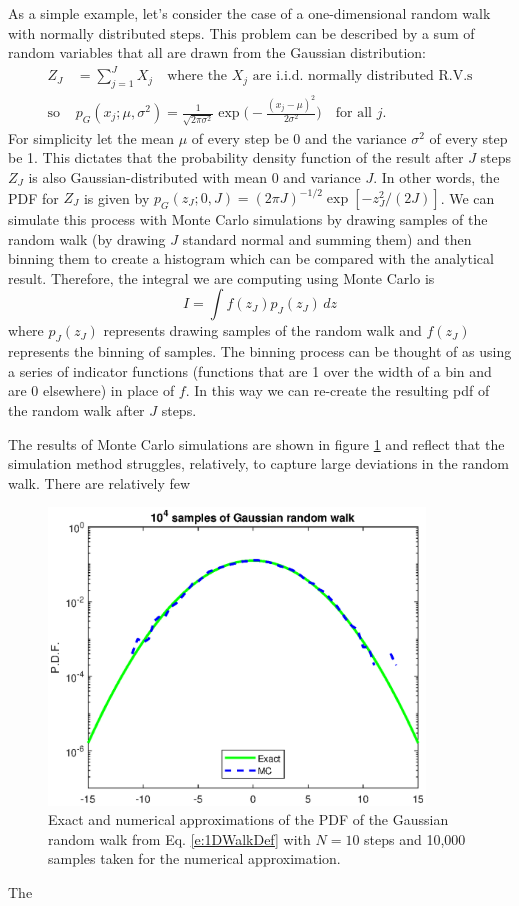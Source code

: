 \documentclass[12pt]{scrartcl}
\begin{document}
As a simple example, let's consider the case of a one-dimensional random walk with normally distributed steps. This problem can be described by a sum of random variables that all are drawn from the Gaussian distribution:
%
\begin{align}
\label{e:1DWalkDef}
Z_J &= \sum_{j=1}^J X_j \quad \text{where the $X_j$ are i.i.d. normally distributed R.V.s} \\ 
\text{so } &p_G(x_j;\mu,\sigma^2) = \frac{1}{\sqrt{2\pi \sigma^2}}\exp{{\Big (}-\frac{(x_j-\mu)^2}{2\sigma^2} {\Big )}} \quad \text{for all } j. \nonumber
\end{align}
%
For simplicity let the mean $\mu$ of every step be 0 and the variance $\sigma^2$ of every step be 1. This dictates that the probability density function of the result after $J$ steps $Z_J$ is also Gaussian-distributed with mean 0 and variance $J$. In other words, the PDF for $Z_J$ is given by $ p_G(z_J;0,J) = (2\pi J)^{-1/2}\exp[-z_J^2/(2J)]$. We can simulate this process with Monte Carlo simulations by drawing samples of the random walk (by drawing $J$ standard normal and summing them) and then binning them to create a histogram which can be compared with the analytical result. Therefore, the integral we are computing using Monte Carlo is 
\[ I=\int f(z_J)p_J(z_J)\,dz\] 
where $p_J(z_J)$ represents drawing samples of the random walk and $f(z_J)$ represents the binning of samples.
The binning process can be thought of as using a series of indicator functions (functions that are 1 over the width of a bin and are 0 elsewhere) in place of $f$. In this way we can re-create the resulting pdf of the random walk after $J$ steps.

The results of Monte Carlo simulations are shown in figure \ref{fig:SimpleGMC} and reflect that the simulation method struggles, relatively, to capture large deviations in the random walk. There are relatively few 
%
\begin{figure}
	\begin{center}
		\includegraphics[width=10cm]{GMC.eps}
		\caption[Monte Carlo sampling for the Gaussian random walk.]{Exact and numerical approximations of the PDF of the Gaussian random walk from Eq. \eqref{e:1DWalkDef} with $N=10$ steps and 10,000 samples taken for the numerical approximation. }
		\label{fig:SimpleGMC}
	\end{center}
\end{figure}
%
The 
\end{document}
